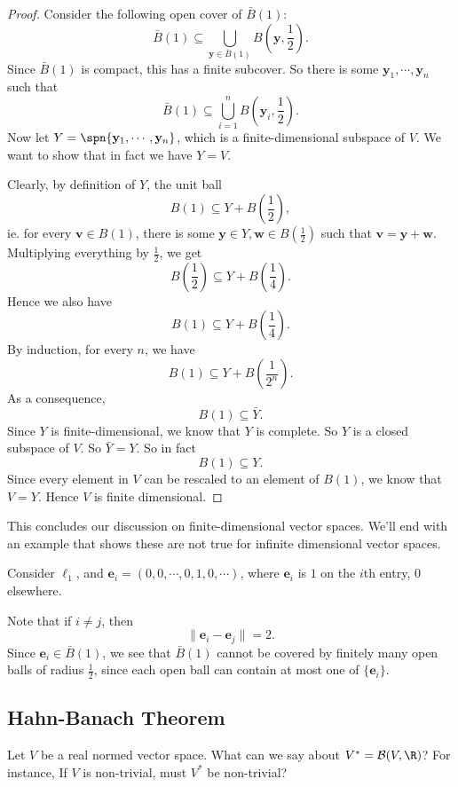 \documentclass[a4paper]{article}
\begin{document}
\begin{proof}
  Consider the following open cover of $\bar{B}(1)$:
  \[
    \bar{B}(1) \subseteq \bigcup_{\mathbf{y}\in \bar{B}(1)} B\left(\mathbf{y}, \frac{1}{2}\right).
  \]
  Since $\bar{B}(1)$ is compact, this has a finite subcover. So there is some $\mathbf{y}_1, \cdots, \mathbf{y}_n$ such that
  \[
    \bar{B}(1) \subseteq \bigcup_{i = 1}^n B\left(\mathbf{y}_i, \frac{1}{2}\right).
  \]
  Now let $Y = \spn\{\mathbf{y}_1, \cdots, \mathbf{y}_n\}$, which is a finite-dimensional subspace of $V$. We want to show that in fact we have $Y = V$.

  Clearly, by definition of $Y$, the unit ball
  \[
    B(1) \subseteq Y + B\left(\frac{1}{2}\right),
  \]
  ie. for every $\mathbf{v}\in B(1)$, there is some $\mathbf{y}\in Y, \mathbf{w} \in B(\frac{1}{2})$ such that $\mathbf{v} = \mathbf{y} + \mathbf{w}$. Multiplying everything by $\frac{1}{2}$, we get
  \[
    B\left(\frac{1}{2}\right) \subseteq Y + B\left(\frac{1}{4}\right).
  \]
  Hence we also have
  \[
    B(1) \subseteq Y + B\left(\frac{1}{4}\right).
  \]
  By induction, for every $n$, we have
  \[
    B(1) \subseteq Y + B\left(\frac{1}{2^n}\right).
  \]
  As a consequence,
  \[
    B(1) \subseteq \bar{Y}.
  \]
  Since $Y$ is finite-dimensional, we know that $Y$ is complete. So $Y$ is a closed subspace of $V$. So $\bar{Y} = Y$. So in fact
  \[
    B(1) \subseteq Y.
  \]
  Since every element in $V$ can be rescaled to an element of $B(1)$, we know that $V = Y$. Hence $V$ is finite dimensional.
\end{proof}
This concludes our discussion on finite-dimensional vector spaces. We'll end with an example that shows these are not true for infinite dimensional vector spaces.
\begin{eg}
  Consider $\ell_1$, and $\mathbf{e}_i = (0, 0, \cdots, 0, 1, 0, \cdots)$, where $\mathbf{e}_i$ is $1$ on the $i$th entry, $0$ elsewhere.

  Note that if $i \not= j$, then
  \[
    \|\mathbf{e}_i - \mathbf{e}_j\| = 2.
  \]
  Since $\mathbf{e}_i \in \bar{B}(1)$, we see that $\bar{B}(1)$ cannot be covered by finitely many open balls of radius $\frac{1}{2}$, since each open ball can contain at most one of $\{\mathbf{e}_i\}$.
\end{eg}

\subsection{Hahn-Banach Theorem}
Let $V$ be a real normed vector space. What can we say about $V^* = \mathcal{B}(V, \R)$? For instance, If $V$ is non-trivial, must $V^*$ be non-trivial?
\end{document}
